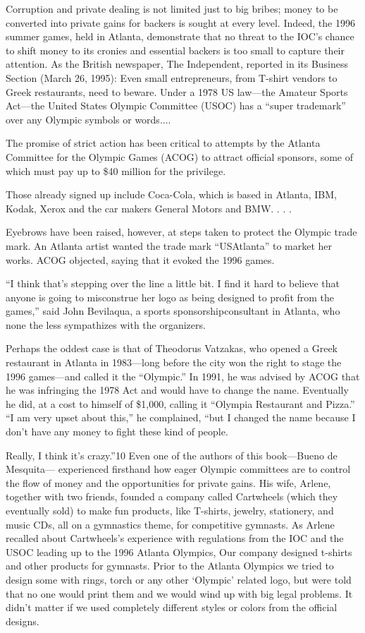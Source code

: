 \documentclass[10pt]{article}
\begin{document}
{\large Corruption and private dealing is not limited just to big bribes; money
to be converted into private gains for backers is sought at every level. Indeed,
the 1996 summer games, held in Atlanta, demonstrate that no threat to the IOC's
chance to shift money to its cronies and essential backers is too small to
capture their attention. As the British newspaper, The Independent, reported in
its Business Section (March 26, 1995): Even small entrepreneurs, from T-shirt
vendors to Greek restaurants, need to beware. Under a 1978 US law---the Amateur
Sports Act---the United States Olympic Committee (USOC) has a ``super trademark''
over any Olympic symbols or words....}

{\large The promise of strict action has been critical to attempts by the
Atlanta Committee for the Olympic Games (ACOG) to attract official sponsors, some
of which must pay up to \$40 million for the privilege.}

{\large Those already signed up include Coca-Cola, which is based in Atlanta,
IBM, Kodak, Xerox and the car makers General Motors and BMW. . . .}

{\large Eyebrows have been raised, however, at steps taken to protect the
Olympic trade mark. An Atlanta artist wanted the trade mark ``USAtlanta'' to
market her works. ACOG objected, saying that it evoked the 1996 games.}

{\large ``I think that's stepping over the line a little bit. I find it hard to
believe that anyone is going to misconstrue her logo as being designed to profit
from the games,'' said John Bevilaqua, a sports sponsorshipconsultant in Atlanta,
who none the less sympathizes with the organizers.}

{\large Perhaps the oddest case is that of Theodorus Vatzakas, who opened a
Greek restaurant in Atlanta in 1983---long before the city won the right to stage
the 1996 games---and called it the ``Olympic.'' In 1991, he was advised by ACOG
that he was infringing the 1978 Act and would have to change the name. Eventually
he did, at a cost to himself of \$1,000, calling it ``Olympia Restaurant and
Pizza.'' ``I am very upset about this,'' he complained, ``but I changed the name
because I don't have any money to fight these kind of people.}

{\large Really, I think it's crazy.''10 Even one of the authors of this
book---Bueno de Mesquita--- experienced firsthand how eager Olympic committees
are to control the flow of money and the opportunities for private gains. His
wife, Arlene, together with two friends, founded a company called Cartwheels
(which they eventually sold) to make fun products, like T-shirts, jewelry,
stationery, and music CDs, all on a gymnastics theme, for competitive gymnasts.
As Arlene recalled about Cartwheels's experience with regulations from the IOC
and the USOC leading up to the 1996 Atlanta Olympics, Our company designed
t-shirts and other products for gymnasts. Prior to the Atlanta Olympics we tried
to design some with rings, torch or any other `Olympic' related logo, but were
told that no one would print them and we would wind up with big legal problems.
It didn't matter if we used completely different styles or colors from the
official designs.}
\end{document}
